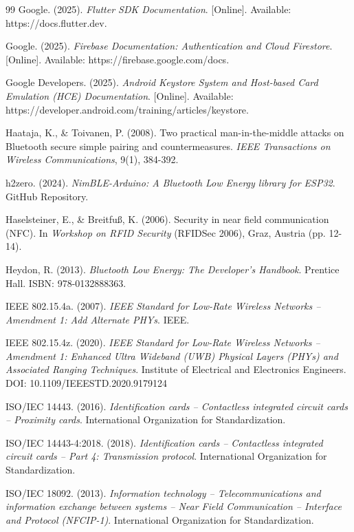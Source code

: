 \begin{thebibliography}{99}
Google. (2025). \textit{Flutter SDK Documentation}. [Online]. Available: https://docs.flutter.dev.

Google. (2025). \textit{Firebase Documentation: Authentication and Cloud Firestore}. [Online]. Available: https://firebase.google.com/docs.

Google Developers. (2025). \textit{Android Keystore System and Host-based Card Emulation (HCE) Documentation}. [Online]. Available: https://developer.android.com/training/articles/keystore.

Haataja, K., \& Toivanen, P. (2008). Two practical man-in-the-middle attacks on Bluetooth secure simple pairing and countermeasures. \textit{IEEE Transactions on Wireless Communications}, 9(1), 384-392.

h2zero. (2024). \textit{NimBLE-Arduino: A Bluetooth Low Energy library for ESP32}. GitHub Repository.

Haselsteiner, E., \& Breitfuß, K. (2006). Security in near field communication (NFC). In \textit{Workshop on RFID Security} (RFIDSec 2006), Graz, Austria (pp. 12-14).

Heydon, R. (2013). \textit{Bluetooth Low Energy: The Developer's Handbook}. Prentice Hall. ISBN: 978-0132888363.

IEEE 802.15.4a. (2007). \textit{IEEE Standard for Low-Rate Wireless Networks -- Amendment 1: Add Alternate PHYs}. IEEE.

IEEE 802.15.4z. (2020). \textit{IEEE Standard for Low-Rate Wireless Networks -- Amendment 1: Enhanced Ultra Wideband (UWB) Physical Layers (PHYs) and Associated Ranging Techniques}. Institute of Electrical and Electronics Engineers. DOI: 10.1109/IEEESTD.2020.9179124

ISO/IEC 14443. (2016). \textit{Identification cards -- Contactless integrated circuit cards -- Proximity cards}. International Organization for Standardization.

ISO/IEC 14443-4:2018. (2018). \textit{Identification cards -- Contactless integrated circuit cards -- Part 4: Transmission protocol}. International Organization for Standardization.

ISO/IEC 18092. (2013). \textit{Information technology -- Telecommunications and information exchange between systems -- Near Field Communication -- Interface and Protocol (NFCIP-1)}. International Organization for Standardization.


\end{thebibliography}
